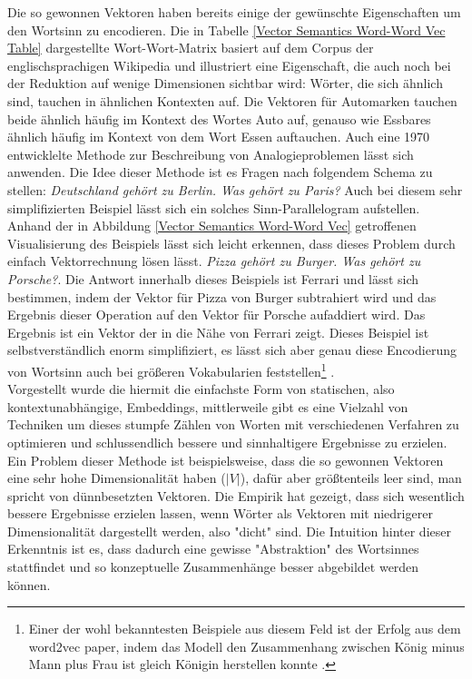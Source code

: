 Die so gewonnen Vektoren haben bereits einige der gewünschte Eigenschaften um den Wortsinn zu encodieren. Die in Tabelle \ref{Vector Semantics Word-Word Vec Table} dargestellte Wort-Wort-Matrix basiert auf dem Corpus der englischsprachigen Wikipedia und illustriert eine Eigenschaft, die auch noch bei der Reduktion auf wenige Dimensionen sichtbar wird: Wörter, die sich ähnlich sind, tauchen in ähnlichen Kontexten auf. Die Vektoren für Automarken tauchen beide ähnlich häufig im Kontext des Wortes Auto auf, genauso wie Essbares ähnlich häufig im Kontext von dem Wort Essen auftauchen. Auch eine 1970 entwicklelte Methode zur Beschreibung von Analogieproblemen lässt sich anwenden. \parencite[Vgl.][]{RUMELHART19731} Die Idee dieser Methode ist es Fragen nach folgendem Schema zu stellen: \emph{Deutschland gehört zu Berlin. Was gehört zu Paris?} Auch bei diesem sehr simplifizierten Beispiel lässt sich ein solches Sinn-Parallelogram aufstellen. Anhand der in Abbildung \ref{Vector Semantics Word-Word Vec} getroffenen Visualisierung des Beispiels lässt sich leicht erkennen, dass dieses Problem durch einfach Vektorrechnung lösen lässt. \emph{Pizza gehört zu Burger. Was gehört zu Porsche?}. Die Antwort innerhalb dieses Beispiels ist Ferrari und lässt sich bestimmen, indem der Vektor für Pizza von Burger subtrahiert wird und das Ergebnis dieser Operation auf den Vektor für Porsche aufaddiert wird. Das Ergebnis ist ein Vektor der in die Nähe von Ferrari zeigt. Dieses Beispiel ist selbstverständlich enorm simplifiziert, es lässt sich aber genau diese Encodierung von Wortsinn auch bei größeren Vokabularien feststellen\footnote{Einer der wohl bekanntesten Beispiele aus diesem Feld ist der Erfolg aus dem word2vec paper, indem das Modell den Zusammenhang zwischen König minus Mann plus Frau ist gleich Königin herstellen konnte \parencite[Vgl.][]{mikolov_chen_corrado_dean_2013}.} \parencite[Vgl.][S. 128f.]{jurafsky_martin_2020}. \\

Vorgestellt wurde die hiermit die einfachste Form von statischen, also kontextunabhängige, Embeddings, mittlerweile gibt es eine Vielzahl von Techniken um dieses stumpfe Zählen von Worten mit verschiedenen Verfahren zu optimieren und schlussendlich bessere und sinnhaltigere Ergebnisse zu erzielen. Ein Problem dieser Methode ist beispielsweise, dass die so gewonnen Vektoren eine sehr hohe Dimensionalität haben ($|V|$), dafür aber größtenteils leer sind, man spricht von dünnbesetzten Vektoren. Die Empirik hat gezeigt, dass sich wesentlich bessere Ergebnisse erzielen lassen, wenn Wörter als Vektoren mit niedrigerer Dimensionalität dargestellt werden, also "dicht" sind. Die Intuition hinter dieser Erkenntnis ist es, dass dadurch eine gewisse "Abstraktion" des Wortsinnes stattfindet und so konzeptuelle Zusammenhänge besser abgebildet werden können. \parencite[Vgl.][S. 113f.]{jurafsky_martin_2020} \\

